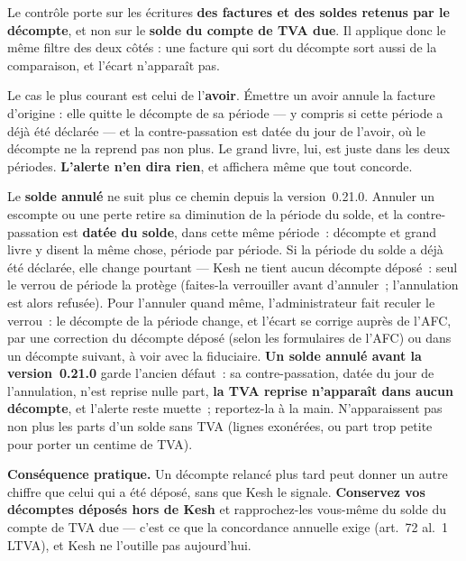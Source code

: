 \documentclass[a4paper,11pt,oneside]{article}
\begin{document}
\begin{keshwarning}[title=\faExclamationTriangle\ Cette alerte ne rapproche pas le décompte du grand livre]
Le contrôle porte sur les écritures \textbf{des factures et des soldes retenus par le décompte}, et non sur
le \textbf{solde du compte de TVA due}. Il applique donc le même filtre des deux côtés : une
facture qui sort du décompte sort aussi de la comparaison, et l'écart n'apparaît pas.

\medskip
\noindent Le cas le plus courant est celui de l'\textbf{avoir}. Émettre un avoir annule la
facture d'origine : elle quitte le décompte de sa période --- y compris si cette période a
déjà été déclarée --- et la contre-passation est datée du jour de l'avoir, où le décompte ne
la reprend pas non plus. Le grand livre, lui, est juste dans les deux périodes.
\textbf{L'alerte n'en dira rien}, et affichera même que tout concorde.

\medskip
\noindent Le \textbf{solde annulé} ne suit plus ce chemin depuis la version~0.21.0. Annuler un
escompte ou une perte retire sa diminution de la période du solde, et la contre-passation est
\textbf{datée du solde}, dans cette même période~: décompte et grand livre y disent la même chose,
période par période. Si la période du solde a déjà été déclarée, elle change pourtant --- Kesh ne
tient aucun décompte déposé~: seul le verrou de période la protège (faites-la verrouiller avant
d'annuler~; l'annulation est alors refusée). Pour l'annuler quand même, l'administrateur fait
reculer le verrou~: le décompte de la période change, et l'écart se corrige auprès de l'AFC, par
une correction du décompte déposé (selon les formulaires de l'AFC) ou dans un décompte suivant, à voir avec la fiduciaire.
\textbf{Un solde annulé avant la version~0.21.0}
garde l'ancien défaut~: sa contre-passation, datée du jour de l'annulation, n'est reprise
nulle part, \textbf{la TVA reprise n'apparaît dans aucun décompte}, et l'alerte reste muette~;
reportez-la à la main. N'apparaissent pas non plus les parts d'un solde sans TVA (lignes
exonérées, ou part trop petite pour porter un centime de TVA).

\medskip
\noindent \textbf{Conséquence pratique.} Un décompte relancé plus tard peut donner un autre
chiffre que celui qui a été déposé, sans que Kesh le signale. \textbf{Conservez vos décomptes
déposés hors de Kesh} et rapprochez-les vous-même du solde du compte de TVA due --- c'est ce
que la concordance annuelle exige (art.~72 al.~1 LTVA), et Kesh ne l'outille pas aujourd'hui.
\end{keshwarning}
\end{document}
